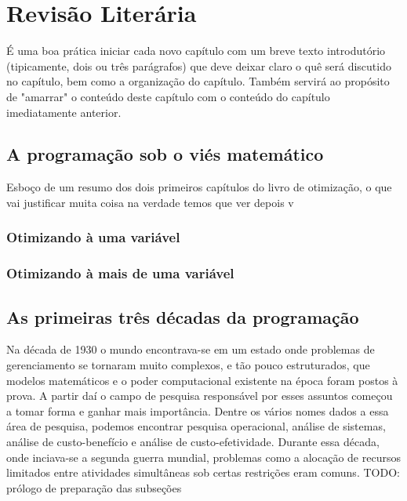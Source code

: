 
\chapter{\larger Revisão Literária}
\label{chap:fundamentacaoTeorica}

É uma boa prática iniciar cada novo capítulo com um breve texto introdutório (tipicamente, dois ou três parágrafos) que deve deixar claro o quê será discutido no capítulo, bem como a organização do capítulo.
Também servirá ao propósito de "amarrar"{} o conteúdo deste capítulo com o conteúdo do capítulo imediatamente anterior.

\section{A programação sob o viés matemático}
Esboço de um resumo dos dois primeiros capítulos do livro de otimização, o que vai justificar muita coisa na verdade temos que ver depois v
\subsection{Otimizando à uma variável}
\subsection{Otimizando à mais de uma variável}


\section{As primeiras três décadas da programação}

Na década de 1930 o mundo encontrava-se em um estado onde problemas de gerenciamento
se tornaram muito complexos, e tão pouco estruturados, que modelos matemáticos e o poder
computacional existente na época foram postos à prova. A partir daí o campo de
pesquisa responsável por esses assuntos começou a tomar forma e ganhar mais importância.
Dentre os vários nomes dados a essa área de pesquisa, podemos encontrar pesquisa operacional,
análise de sistemas, análise de custo-benefício e análise de custo-efetividade. Durante essa
década, onde inciava-se a segunda guerra mundial, problemas como a alocação de recursos
limitados entre atividades simultâneas sob certas restrições eram comuns.
TODO: prólogo de preparação das subseções


